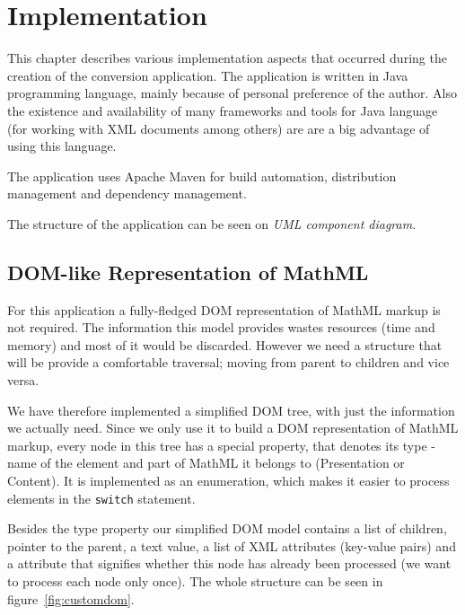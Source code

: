 \documentclass[11pt,oneside,final]{fithesis2}
\begin{document}
\chapter{Implementation}
This chapter describes various implementation aspects that occurred during the creation of the conversion application. The application is written in Java programming language, mainly because of personal preference of the author. Also the existence and availability of many frameworks and tools for Java language (for working with XML documents among others) are are a big advantage of using this language. 

The application uses Apache Maven for build automation, distribution management and dependency management.

The structure of the application can be seen on \textit{UML component diagram}.

\section{DOM-like Representation of MathML}
For this application a fully-fledged DOM representation of MathML markup is not required. The information this model provides wastes resources (time and memory) and most of it would be discarded. However we need a structure that will be provide a comfortable traversal; moving from parent to children and vice versa.

We have therefore implemented a simplified DOM tree, with just the information we actually need. Since we only use it to build a DOM representation of MathML markup, every node in this tree has a special property, that denotes its type - name of the element and part of MathML it belongs to (Presentation or Content). It is implemented as an enumeration, which makes it easier to process elements in the \texttt{switch} statement.

Besides the type property our simplified DOM model contains a list of children, pointer to the parent, a text value, a list of XML attributes (key-value pairs) and a attribute that signifies whether this node has already been processed (we want to process each node only once). The whole structure can be seen in figure~\vref{fig:customdom}.
\end{document}
